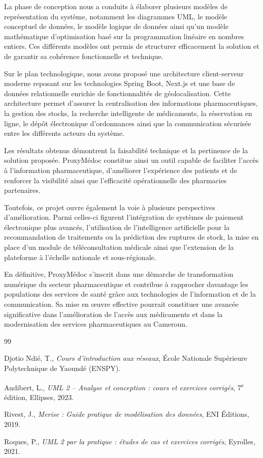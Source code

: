 \documentclass[12pt,a4paper]{report}
\begin{document}
La phase de conception nous a conduits à élaborer plusieurs modèles de représentation du système, notamment les diagrammes UML, le modèle conceptuel de données, le modèle logique de données ainsi qu'un modèle mathématique d'optimisation basé sur la programmation linéaire en nombres entiers. Ces différents modèles ont permis de structurer efficacement la solution et de garantir sa cohérence fonctionnelle et technique.

Sur le plan technologique, nous avons proposé une architecture client-serveur moderne reposant sur les technologies Spring Boot, Next.js et une base de données relationnelle enrichie de fonctionnalités de géolocalisation. Cette architecture permet d'assurer la centralisation des informations pharmaceutiques, la gestion des stocks, la recherche intelligente de médicaments, la réservation en ligne, le dépôt électronique d'ordonnances ainsi que la communication sécurisée entre les différents acteurs du système.

Les résultats obtenus démontrent la faisabilité technique et la pertinence de la solution proposée. ProxyMédoc constitue ainsi un outil capable de faciliter l'accès à l'information pharmaceutique, d'améliorer l'expérience des patients et de renforcer la visibilité ainsi que l'efficacité opérationnelle des pharmacies partenaires.

Toutefois, ce projet ouvre également la voie à plusieurs perspectives d'amélioration. Parmi celles-ci figurent l'intégration de systèmes de paiement électronique plus avancés, l'utilisation de l'intelligence artificielle pour la recommandation de traitements ou la prédiction des ruptures de stock, la mise en place d'un module de téléconsultation médicale ainsi que l'extension de la plateforme à l'échelle nationale et sous-régionale.

En définitive, ProxyMédoc s'inscrit dans une démarche de transformation numérique du secteur pharmaceutique et contribue à rapprocher davantage les populations des services de santé grâce aux technologies de l'information et de la communication. Sa mise en œuvre effective pourrait constituer une avancée significative dans l'amélioration de l'accès aux médicaments et dans la modernisation des services pharmaceutiques au Cameroun.


\begin{thebibliography}{99}

Djotio Ndié, T.,
\textit{Cours d'introduction aux réseaux},
École Nationale Supérieure Polytechnique de Yaoundé (ENSPY).

Audibert, L.,
\textit{UML 2 -- Analyse et conception : cours et exercices corrigés},
7\textsuperscript{e} édition, Ellipses, 2023.

Rivest, J.,
\textit{Merise : Guide pratique de modélisation des données},
ENI Éditions, 2019.

Roques, P.,
\textit{UML 2 par la pratique : études de cas et exercices corrigés},
Eyrolles, 2021.

\end{thebibliography}
\end{document}
